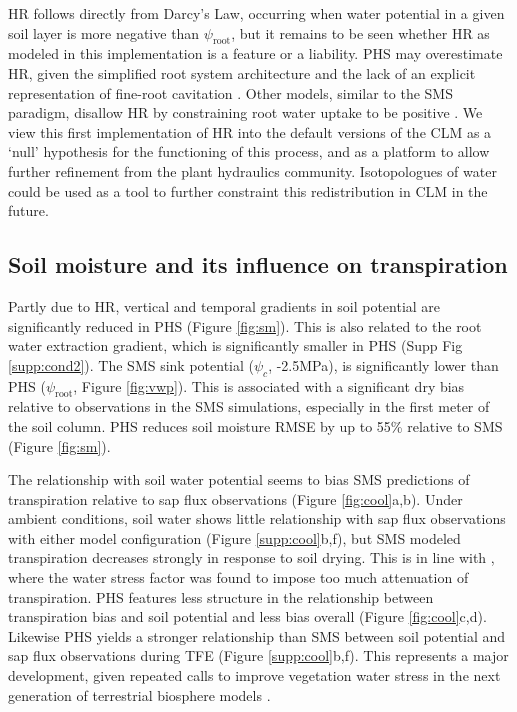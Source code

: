 \documentclass[draft,linenumbers]{agujournal}
\begin{document}
    HR follows directly from Darcy's Law, occurring when water potential in a given soil layer is more negative than $\psi_{\text{root}}$,
    but it remains to be seen whether HR as modeled in this implementation is a feature or a liability.
    PHS may overestimate HR, given the simplified root system architecture \citep{bouda2017} 
    and the lack of an explicit representation of fine-root cavitation \citep{kotowska2015}.
    Other models, similar to the SMS paradigm, disallow HR by constraining root water uptake to be positive \citep{xu2016}.
    We view this first implementation of HR into the default versions of the CLM as a `null' hypothesis for the functioning of this process, and as a platform to allow further refinement from the plant hydraulics community. Isotopologues of water could be used as a tool to further constraint this redistribution in CLM in the future. 

\subsection{Soil moisture and its influence on transpiration}

    Partly due to HR, vertical and temporal gradients in soil potential are significantly reduced in PHS (Figure \ref{fig:sm}).
    This is also related to the root water extraction gradient, which is significantly smaller in PHS (Supp Fig \ref{supp:cond2}).
    The SMS sink potential ($\psi_c$, -2.5MPa), is significantly lower than PHS ($\psi_{\text{root}}$, Figure \ref{fig:vwp}).
    This is associated with a significant dry bias relative to observations in the SMS simulations, especially in the first meter of the soil column.
    PHS reduces soil moisture RMSE by up to 55\% relative to SMS (Figure \ref{fig:sm}).
    
    The relationship with soil water potential seems to bias SMS predictions of transpiration relative to sap flux observations (Figure \ref{fig:cool}a,b).
    Under ambient conditions, soil water shows little relationship with sap flux observations with either model configuration (Figure \ref{supp:cool}b,f), 
    but SMS modeled transpiration decreases strongly in response to soil drying.
    This is in line with \cite{bonan2014}, where the water stress factor was found to impose too much attenuation of transpiration.
    PHS features less structure in the relationship between transpiration bias and soil potential and less bias overall (Figure \ref{fig:cool}c,d).
    Likewise PHS yields a stronger relationship than SMS between soil potential and sap flux observations during TFE (Figure \ref{supp:cool}b,f).
    This represents a major development, given repeated calls to improve vegetation water stress in the next generation of terrestrial biosphere models \citep{powell2013,rogers2017}.
\end{document}
